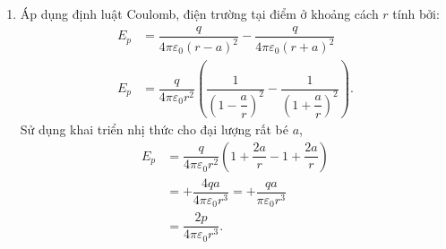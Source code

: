 \begin{loigiai}
\begin{enumerate}[1)]
    \item Áp dụng định luật Coulomb, điện trường tại điểm ở khoảng cách $r$ tính bởi:
    \[\begin{aligned}
    E_{p} &= \dfrac{q}{4 \pi \varepsilon_{0}(r-a)^{2}}-\dfrac{q}{4 \pi \varepsilon_{0}(r+a)^{2}} \\
    E_{p} &= \dfrac{q}{4 \pi \varepsilon_{0} r^{2}}\left(\dfrac{1}{\left(1-\dfrac{a}{r}\right)^{2}}-\dfrac{1}{\left(1+\dfrac{a}{r}\right)^{2}}\right).
\end{aligned} \tag{1}\label{q.10.1}\]
    Sử dụng khai triển nhị thức cho đại lượng rất bé $a$, 
    \[
    \begin{aligned}
    E_{p} &=\dfrac{q}{4 \pi \varepsilon_{0} r^{2}}\left(1+\dfrac{2 a}{r}-1+\dfrac{2 a}{r}\right) \\
    &=+\dfrac{4 q a}{4 \pi \varepsilon_{0} r^{3}}=+\dfrac{q a}{\pi \varepsilon_{0} r^{3}} \\
    &=\dfrac{2 p}{4 \pi \varepsilon_{0} r^{3}}.
    \end{aligned}\tag{2}\label{q.10.2}\]
    

\end{enumerate}
\end{loigiai}
